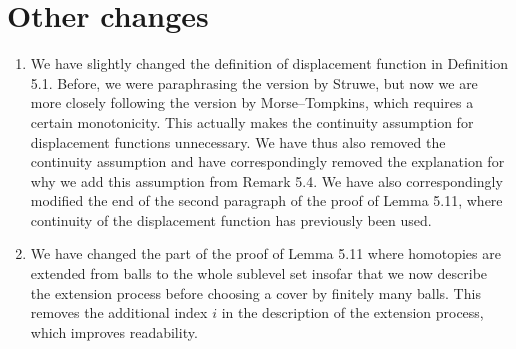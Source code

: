 \documentclass{article}
\begin{document}
	\section{Other changes}
	\begin{enumerate}
		\item We have slightly changed the definition of displacement function in Definition 5.1. Before, we were paraphrasing the version by Struwe, but now we are more closely following the version by Morse--Tompkins, which requires a certain monotonicity. This actually makes the continuity assumption for displacement functions unnecessary. We have thus also removed the continuity assumption and have correspondingly removed the explanation for why we add this assumption from Remark 5.4. We have also correspondingly modified the end of the second paragraph of the proof of Lemma 5.11, where continuity of the displacement function has previously been used.
		\item We have changed the part of the proof of Lemma 5.11 where homotopies are extended from balls to the whole sublevel set insofar that we now describe the extension process before choosing a cover by finitely many balls. This removes the additional index $i$ in the description of the extension process, which improves readability.
	\end{enumerate}
\end{document}
